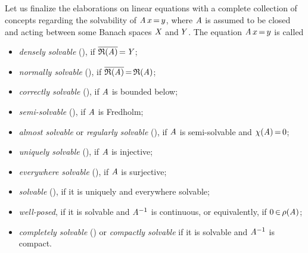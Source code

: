 \documentclass[11pt,twoside]{article}
\begin{document}
\subsection{} %
Let us finalize the elaborations on linear equations
with a complete collection of concepts
regarding the solvability of $\mathit{A} \, x {\,=\,} y$,
where $\mathit{A}$ is assumed to be closed
and acting between some Banach spaces $\mathit{X}$ and\,$\mathit{Y}$.
The equation $\mathit{A} \, x {\,=\,} y$ is called

\begin{itemize}[leftmargin=9mm]
\item[(a)]
\textit{densely solvable} (\cite{Kr}),
if $\overline{\mathfrak{R}(\mathit{A})} {\,=\,} \mathit{Y}$;

\item[(b)]
\textit{normally solvable} (\cite{Kr}),
if $\overline{\mathfrak{R}(\mathit{A})} {\,=\,} \mathfrak{R}(\mathit{A})$;

\item[(c)]
\textit{correctly solvable} (\cite{Kr}),
if $\mathit{A}$ is bounded below;

\item[(d)]
\textit{semi-solvable} (\cite{Br1}), if $\mathit{A}$ is Fredholm;

\item[(e)]
\textit{almost solvable} or \textit{regularly solvable} (\cite{Br1}),
if $\mathit{A}$ is semi-solvable and $\chi(\mathit{A}) {\,=\,} 0$;

\item[(f)]
\textit{uniquely solvable} (\cite{Kr}),
if $\mathit{A}$ is injective;

\item[(g)]
\textit{everywhere solvable} (\cite{Kr}),
if $\mathit{A}$ is surjective;

\item[(h)]
\textit{solvable} (\cite{Br1}),
if it is uniquely and everywhere solvable;

\item[(i)]
\textit{well-posed},
if it is solvable and $\mathit{A}^{-1}$ is continuous,
or equivalently,
if $0 {\,\in\,} \rho(\mathit{A})$;

\item[(j)]
\textit{completely solvable} (\cite{Br1}) or \textit{compactly solvable}
if it is solvable and $\mathit{A}^{-1}$ is compact.
\end{itemize}

\end{document}
